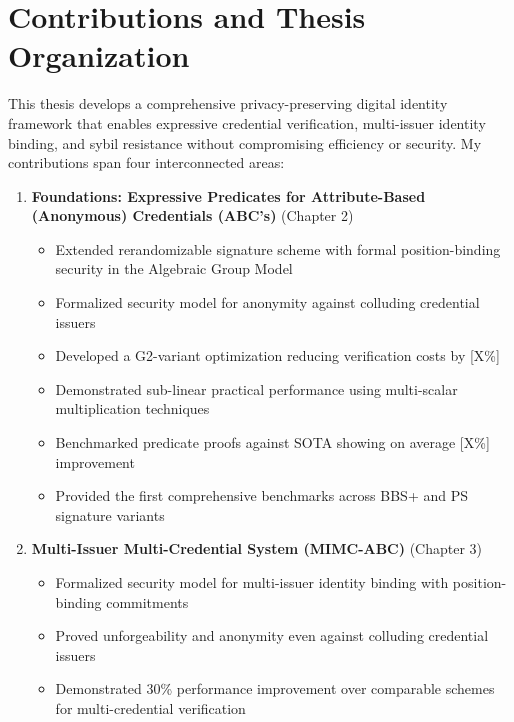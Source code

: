 \section{Contributions and Thesis Organization}

This thesis develops a comprehensive privacy-preserving digital identity framework that enables expressive credential verification, multi-issuer identity binding, and sybil resistance without compromising efficiency or security. My contributions span four interconnected areas:

\begin{enumerate}
    \item \textbf{Foundations: Expressive Predicates for Attribute-Based (Anonymous) Credentials (ABC's)} (Chapter 2)
    \begin{itemize}
        \item Extended rerandomizable signature scheme with formal position-binding security in the Algebraic Group Model
        \item Formalized security model for anonymity against colluding credential issuers
        \item Developed a G2-variant optimization reducing verification costs by [X\%]
        \item Demonstrated sub-linear practical performance using multi-scalar multiplication techniques
        \item Benchmarked predicate proofs against SOTA showing on average [X\%] improvement
        \item Provided the first comprehensive benchmarks across BBS+ and PS signature variants
    \end{itemize}

    \item \textbf{Multi-Issuer Multi-Credential System (MIMC-ABC)} (Chapter 3)
    \begin{itemize}
        \item Formalized security model for multi-issuer identity binding with position-binding commitments
        \item Proved unforgeability and anonymity even against colluding credential issuers
        \item Demonstrated 30\% performance improvement over comparable schemes for multi-credential verification
    \end{itemize}
    

\end{enumerate}
